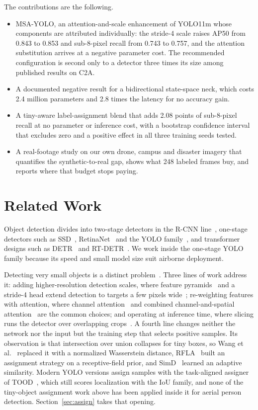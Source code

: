 \documentclass[conference,a4paper]{IEEEtran}
\begin{document}
The contributions are the following.
\begin{itemize}
\item MSA-YOLO, an attention-and-scale enhancement of YOLO11m whose components
are attributed individually: the stride-4 scale raises AP50 from 0.843 to 0.853
and sub-8-pixel recall from 0.743 to 0.757, and the attention substitution
arrives at a negative parameter cost. The recommended configuration is second
only to a detector three times its size among published results on C2A.
\item A documented negative result for a bidirectional state-space neck, which
costs 2.4 million parameters and 2.8 times the latency for no accuracy gain.
\item A tiny-aware label-assignment blend that adds 2.08 points of sub-8-pixel
recall at no parameter or inference cost, with a bootstrap confidence interval
that excludes zero and a positive effect in all three training seeds tested.
\item A real-footage study on our own drone, campus and disaster imagery that
quantifies the synthetic-to-real gap, shows what 248 labeled frames buy, and
reports where that budget stops paying.
\end{itemize}

\section{Related Work}
Object detection divides into two-stage detectors in the R-CNN
line~\cite{ren2015fasterrcnn,cai2018cascade}, one-stage detectors such as
SSD~\cite{liu2016ssd}, RetinaNet~\cite{lin2017focal} and the YOLO
family~\cite{redmon2016yolo,wang2024yolov9,jocher2024yolo11}, and
transformer designs such as DETR~\cite{carion2020detr} and
RT-DETR~\cite{zhao2024rtdetr}. We work inside the one-stage YOLO family because
its speed and small model size suit airborne deployment.

Detecting very small objects is a distinct problem~\cite{cheng2023smallobject}.
Three lines of work address it: adding higher-resolution detection scales, where
feature pyramids~\cite{lin2017fpn} and a stride-4 head extend detection to
targets a few pixels wide~\cite{zhu2021tphyolov5}; re-weighting features with
attention, where channel attention~\cite{wang2020eca} and combined
channel-and-spatial attention~\cite{woo2018cbam} are the common choices; and
operating at inference time, where slicing runs the detector over overlapping
crops~\cite{akyon2022sahi}. A fourth line changes neither the network nor the
input but the training step that selects positive samples. Its observation is
that intersection over union collapses for tiny boxes, so
Wang et al.~\cite{wang2021nwd} replaced it with a normalized Wasserstein
distance, RFLA~\cite{xu2022rfla} built an assignment strategy on a
receptive-field prior, and SimD~\cite{shi2024simd} learned an adaptive
similarity. Modern YOLO versions assign samples with the task-aligned assigner
of TOOD~\cite{feng2021tood}, which still scores localization with the IoU
family, and none of the tiny-object assignment work above has been applied
inside it for aerial person detection. Section~\ref{sec:assign} takes that
opening.
\end{document}
